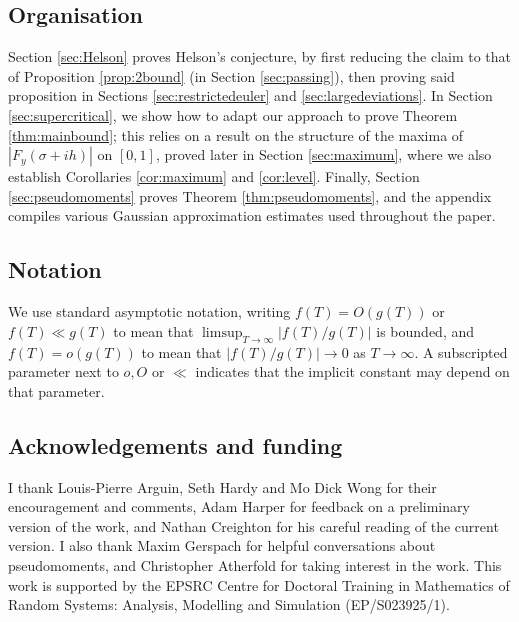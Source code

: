 \documentclass{amsart}
\theoremstyle{definition}
\theoremstyle{remark}
\numberwithin{equation}{section}
\begin{document}
\subsection*{Organisation} Section \ref{sec:Helson} proves  Helson's conjecture, by first reducing the claim to that of Proposition \ref{prop:2bound} (in Section \ref{sec:passing}), then proving said proposition in Sections \ref{sec:restrictedeuler} and \ref{sec:largedeviations}. In Section \ref{sec:supercritical}, we show how to adapt our approach to prove Theorem \ref{thm:mainbound}; this relies on a result on the structure of the maxima of $|F_y(\sigma+ih)|$ on $[0,1]$, proved later in Section \ref{sec:maximum}, where we also establish Corollaries \ref{cor:maximum} and \ref{cor:level}. Finally, Section \ref{sec:pseudomoments} proves Theorem \ref{thm:pseudomoments}, and the appendix compiles various Gaussian approximation estimates used throughout the paper.
 
\subsection*{Notation} We use standard asymptotic notation, writing $f(T) = O(g(T))$ or $f(T) \ll g(T)$ to mean that $\limsup_{T\to\infty} |f (T )/g(T )|$ is bounded, and $f(T) = o(g(T))$ to mean that $|f(T)/g(T)|\to 0$ as $T\to\infty$. A subscripted parameter next to $o, O$ or $\ll$ indicates that the implicit constant may depend on that parameter.
\subsection*{Acknowledgements and funding}
I thank Louis-Pierre Arguin, Seth Hardy and Mo Dick Wong for their encouragement and comments, Adam Harper for feedback on a preliminary version of the work, and Nathan Creighton for his careful reading of the current version. I also thank Maxim Gerspach for helpful conversations about pseudomoments, and Christopher Atherfold for taking interest in the work. This work is supported by the EPSRC Centre for Doctoral Training in Mathematics of Random Systems: Analysis, Modelling and Simulation (EP/S023925/1). 
\end{document}
